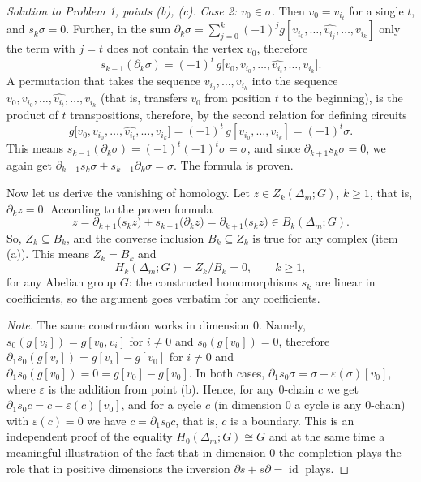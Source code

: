 \documentclass[a4paper,12pt]{report}
\begin{document}
\begin{proof}[Solution to Problem \textup{1}, points \textup{(b)}, \textup{(c)}]
\emph{Case \textup{2}\textup{:} $v_0\in\sigma$.} Then $v_0=v_{i_t}$ for a single $t$, and $s_k\sigma=0$. Further, in the sum $\partial_k\sigma=\sum_{j=0}^{k}(-1)^{j}g[v_{i_0},\dots,\widehat{v_{i_j}},\dots,v_{i_k}]$ only the term with $j=t$ does not contain the vertex $v_0$, therefore
\[
s_{k-1}(\partial_k\sigma)=(-1)^{t}\,g\bigl[v_0,v_{i_0},\dots,\widehat{v_{i_t}},\dots,v_{i_k}\bigr].
\]
A permutation that takes the sequence $v_{i_0},\dots,v_{i_k}$ into the sequence $v_0,v_{i_0},\dots,\widehat{v_{i_t}},\dots,v_{i_k}$ \textup{(}that is, transfers $v_0$ from position $t$ to the beginning\textup{)}, is the product of $t$ transpositions, therefore, by the second relation for defining circuits
\[
g\bigl[v_0,v_{i_0},\dots,\widehat{v_{i_t}},\dots,v_{i_k}\bigr]=(-1)^{t}\,g[v_{i_0},\dots,v_{i_k}]=(-1)^{t}\sigma .
\]
This means $s_{k-1}(\partial_k\sigma)=(-1)^{t}(-1)^{t}\sigma=\sigma$, and since $\partial_{k+1}s_k\sigma=0$, we again get $\partial_{k+1}s_k\sigma+s_{k-1}\partial_k\sigma=\sigma$. The formula is proven.

Now let us derive the vanishing of homology. Let $z\in Z_k(\Delta_m;G)$, $k\ge1$, that is, $\partial_k z=0$. According to the proven formula
\[
z=\partial_{k+1}\bigl(s_k z\bigr)+s_{k-1}\bigl(\partial_k z\bigr)=\partial_{k+1}\bigl(s_k z\bigr)\in B_k(\Delta_m;G).
\]
So, $Z_k\subseteq B_k$, and the converse inclusion $B_k\subseteq Z_k$ is true for any complex \textup{(}item \textup{(a)}\textup{)}. This means $Z_k=B_k$ and
\[
H_k(\Delta_m;G)=Z_k/B_k=0,\qquad k\ge1 ,
\]
for any Abelian group $G$: the constructed homomorphisms $s_k$ are linear in coefficients, so the argument goes verbatim for any coefficients.

\emph{Note.} The same construction works in dimension $0$. Namely, $s_0(g[v_i])=g[v_0,v_i]$ for $i\ne0$ and $s_0(g[v_0])=0$, therefore $\partial_1 s_0(g[v_i])=g[v_i]-g[v_0]$ for $i\ne0$ and $\partial_1s_0(g[v_0])=0=g[v_0]-g[v_0]$. In both cases, $\partial_1 s_0\sigma=\sigma-\varepsilon(\sigma)[v_0]$, where $\varepsilon$ is the addition from point \textup{(b)}. Hence, for any $0$-chain $c$ we get $\partial_1s_0c=c-\varepsilon(c)[v_0]$, and for a cycle $c$ \textup{(}in dimension $0$ a cycle is any $0$-chain\textup{)} with $\varepsilon(c)=0$ we have $c=\partial_1 s_0c$, that is, $c$ is a boundary. This is an independent proof of the equality $H_0(\Delta_m;G)\cong G$ and at the same time a meaningful illustration of the fact that in dimension $0$ the completion plays the role that in positive dimensions the inversion $\partial s+s\partial=\operatorname{id}$ plays.
\end{proof}
\end{document}
